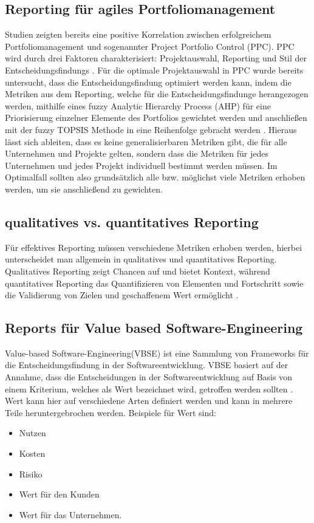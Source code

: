 \subsection{Reporting für agiles Portfoliomanagement}
Studien zeigten bereits eine positive Korrelation zwischen erfolgreichem Portfoliomanagement und sogenannter Project Portfolio Control (PPC). PPC wird durch drei Faktoren charakterisiert: Projektauswahl, Reporting und Stil der Entscheidungsfindungs \cite{}.
Für die optimale Projektauswahl in PPC wurde bereits untersucht, dass die Entscheidungsfindung optimiert werden kann, indem die Metriken aus dem Reporting, welche für die Entscheidungsfindunge herangezogen werden, mithilfe eines fuzzy Analytic Hierarchy Process (AHP) für eine Priorisierung einzelner Elemente des Portfolios gewichtet werden und anschließen mit der fuzzy TOPSIS Methode in eine Reihenfolge gebracht werden \cite{}.
Hieraus lässt sich ableiten, dass es keine generalisierbaren Metriken gibt, die für alle Unternehmen und Projekte gelten, sondern dass die Metriken für jedes Unternehmen und jedes Projekt individuell bestimmt werden müssen. Im Optimalfall sollten also grundsätzlich alle bzw. möglichst viele  Metriken erhoben werden, um sie anschließend zu gewichten.

\subsection{qualitatives vs. quantitatives Reporting}
Für effektives Reporting müssen verschiedene Metriken erhoben werden, hierbei unterscheidet man allgemein in qualitatives und quantitatives Reporting.
Qualitatives Reporting zeigt Chancen auf und bietet Kontext, während quantitatives Reporting das Quantifizieren von Elementen und Fortschritt sowie die Validierung von Zielen und geschaffenem Wert ermöglicht \cite{}.

\subsection{Reports für Value based Software-Engineering}
Value-based Software-Engineering(VBSE) ist eine Sammlung von Frameworks für die Entscheidungsfindung in der Softwareentwicklung. VBSE basiert auf der Annahme, dass die Entscheidungen in der Softwareentwicklung auf Basis von einem Kriterium, welches als Wert bezeichnet wird, getroffen werden sollten \cite{}.
Wert kann hier auf verschiedene Arten definiert werden und kann in mehrere Teile heruntergebrochen werden. Beispiele für Wert sind:
\begin{itemize}
  \item Nutzen
  \item Kosten
  \item Risiko
  \item Wert für den Kunden
  \item Wert für das Unternehmen.
\end{itemize}

